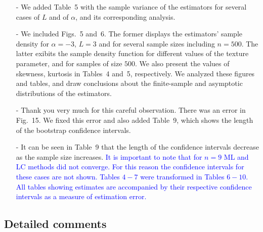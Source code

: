 \documentclass{ar2rc}
\begin{document}
	\begin{itemize}
		\item [-] We added Table~5 with the sample variance of the estimators for several cases of $L$ and of $\alpha$, and its corresponding analysis.
		
		\item [-] We included Figs.~5 and~6. 
			The former displays the estimators' sample density for $\alpha=-3$, $L=3$ and for several sample sizes including $n=500$. 
			The latter exibits the sample density function for different values of the texture parameter, and for samples of size $500$. 
			We also present the values of skewness, kurtosis in Tables~4 and~5, respectively. We analyzed these figures and tables, and draw conclusions about the finite-sample and asymptotic distributions of the estimators.
		
		\item [-] Thank you very much for this careful observation. There was an error in Fig.~15. We fixed this error and also added Table~9, which shows the length of the bootstrap confidence intervals.
		
		\item [-] It can be seen in Table~9 that the length of the confidence intervals decrease as the sample size increases. \textcolor{blue}{It is important to note that for $n=9$ ML and LC methods did not converge. For this reason the confidence intervals for these cases are not shown. Tables $4-7$ were transformed in Tables $6-10$. All tables showing estimates are accompanied by their respective confidence intervals as a measure of estimation error.} 
	\end{itemize}
	
	
	
	
	\subsection{Detailed comments}
	
	
\end{document}
